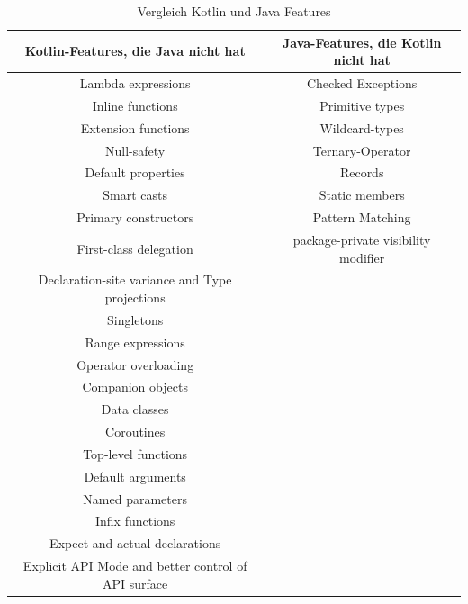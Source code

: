 \documentclass[11pt]{article}
\begin{document}
    \begin{table}[h!]
        \centering
        \begin{tabular}{|c|c|}
            \hline
            \textbf{Kotlin-Features, die Java nicht hat} & \textbf{Java-Features, die Kotlin nicht hat} \\
            \hline
            \hline
            Lambda expressions & Checked Exceptions \\
            \hline
            Inline functions & Primitive types \\
            \hline
            Extension functions & Wildcard-types \\
            \hline
            Null-safety & Ternary-Operator \\
            \hline
            Default properties & Records \\
            \hline
            Smart casts & Static members \\
            \hline
            Primary constructors & Pattern Matching \\
            \hline
            First-class delegation & package-private visibility modifier \\
            \hline
            Declaration-site variance and Type projections &  \\
            \hline
            Singletons &  \\
            \hline
            Range expressions &  \\
            \hline
            Operator overloading &  \\
            \hline
            Companion objects &  \\
            \hline
            Data classes &  \\
            \hline
            Coroutines &  \\
            \hline
            Top-level functions &  \\
            \hline
            Default arguments &  \\
            \hline
            Named parameters &  \\
            \hline
            Infix functions &  \\
            \hline
            Expect and actual declarations &  \\
            \hline
            Explicit API Mode and better control of API surface &  \\
            \hline
        \end{tabular}
        \caption{Vergleich Kotlin und Java Features}
        \label{tab:kotlin-java-features}
    \end{table}
\end{document}
